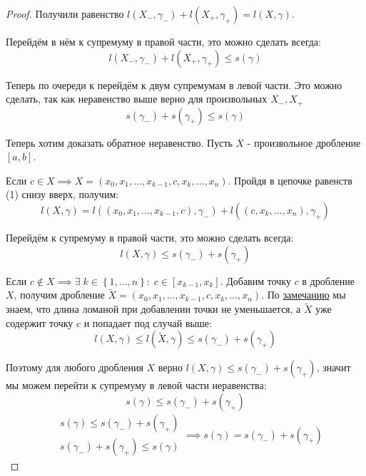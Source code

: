 \documentclass[../main.tex]{subfiles}
\begin{document}
\begin{proof}
    Получили равенство \(l \left( X_-, \gamma _-\right)+l\left( X_+, \gamma _+\right)=l\left( X, \gamma \right)\).

    Перейдём в нём к супремуму в правой части, это можно сделать всегда: 
    \[ l \left( X_-, \gamma _-\right)+l \left( X_+, \gamma _+\right) \leq s\left( \gamma \right)\]

    Теперь по очереди к перейдём к двум супремумам в левой части. Это можно сделать, так как неравенство выше верно для произвольных \( X_-, X_+\) 
    \[ s\left( \gamma _-\right)+s\left( \gamma _+\right) \leq s\left( \gamma \right)\]

    Теперь хотим доказать обратное неравенство. Пусть \( X\) - произвольное дробление \( \left[ a,b\right]\).

    Если \( c \in X \implies X=\left( x_0,x_1, \dots,x_{k-1},c,x_k, \dots,x_n\right)\). Пройдя в цепочке равенств (1) снизу вверх, получим:
    \[ l \left( X, \gamma \right)=l\left( \left( x_0, x_1, \dots,x_{k-1},c\right), \gamma _-\right)+l \left( \left( c,x_k, \dots,x_n\right), \gamma _+\right)\]

    Перейдём к супремуму в правой части, это можно сделать всегда:
    \[ l \left( X, \gamma \right) \leq s\left( \gamma _-\right)+s\left( \gamma _+\right)\]

    Если \( c \notin X \implies \exists \; k \in \left\{ 1, \dots,n\right\}:\;c \in \left[ x_{k-1}, x_k\right]\). Добавим точку \( c\) в дробление 
    \( X\), получим дробление \( \tilde{ X}=\left( x_0,x_1, \dots,x_{k-1}, c, x_k, \dots, x_n\right)\). По \hyperlink{add_point_in_X}{замечанию} мы знаем, что
    длина ломаной при добавлении точки не уменьшается, а \( \tilde{ X}\) уже содержит точку \( c\) и попадает под случай выше:
    \[ l \left( X, \gamma \right) \leq l ( \tilde{ X}, \gamma ) \leq s\left( \gamma _-\right)+s\left( \gamma _+\right)\]

    Поэтому для любого дробления \( X\) верно \( l \left( X, \gamma \right) \leq s\left( \gamma _-\right)+s\left( \gamma _+\right)\), значит мы можем перейти к супремуму в левой части неравенства:
    \[ s\left( \gamma \right) \leq s\left( \gamma _-\right)+s\left( \gamma _+\right)\]
    \begin{equation*}
        \begin{aligned}
            &s\left( \gamma \right) \leq s\left( \gamma _-\right)+s\left( \gamma _+\right)\\ 
            &s\left( \gamma _-\right)+s\left( \gamma _+\right) \leq s\left( \gamma \right)
        \end{aligned}
        \implies 
        s\left( \gamma \right)=s\left( \gamma _-\right)+s\left( \gamma _+\right)
    \end{equation*}
\end{proof}
\end{document}
